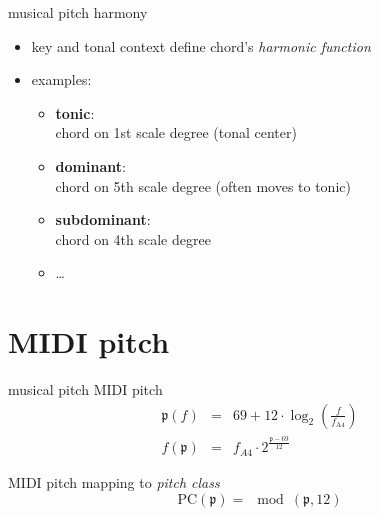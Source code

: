         \begin{frame}{musical pitch}{ harmony}
            \begin{itemize}
                \item	key and tonal context define chord's \textit{harmonic function}
                \smallskip
                \item   examples:
                \begin{itemize}
                    \item	\textbf{tonic}:\\ chord on 1st scale degree (tonal center)
                    \item	\textbf{dominant}:\\ chord on 5th scale degree (often moves to tonic)
                    \item	\textbf{subdominant}:\\ chord on 4th scale degree
                    \item	\ldots
                \end{itemize}
            \end{itemize}
        \end{frame}

    \section{MIDI pitch}
        \begin{frame}{musical pitch}{ MIDI pitch}
                \begin{eqnarray*}\label{eq:midi_pitch}
                    \mathfrak{p}(f) &=& 69 + 12\cdot\log_2\left(\frac{f}{f_\mathrm{A4}}\right) \\
                    f(\mathfrak{p}) &=& f_{A4}\cdot2^{\frac{\mathfrak{p}-69}{12}}
                \end{eqnarray*}
                
                \pause
                MIDI pitch mapping to \textit{pitch class}
                \begin{equation*}\label{eq:pcidx}
                    \mathrm{PC}(\mathfrak{p}) = \mod(\mathfrak{p}, 12) 
                \end{equation*}
                
        \end{frame}
    
